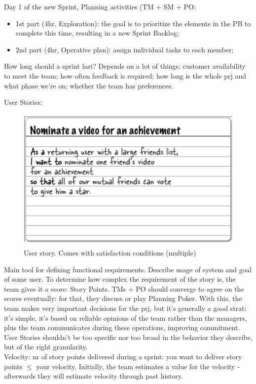 \noindent Day 1 of the new Sprint, Planning activities (TM + SM + PO:
\begin{itemize}
    \item 1st part (4hr, Exploration): the goal is to prioritize the elements in the PB to complete this time, resulting in a new Sprint Backlog;
    \item 2nd part (4hr, Operative plan): assign individual tasks to each member;
\end{itemize}

\noindent How long should a sprint last? Depends on a lot of things: customer availability to meet the team; how often feedback is required; how long is the whole prj and what phase we're on; whether the team has preferences.

 \noindent User Stories:
 \begin{figure}[H]
     \centering
     \includegraphics[scale=0.4]{Figures/02/usrstories.png}
     \caption{User story. Comes with satisfaction conditions (multiple)}
     \label{fig:us1}
 \end{figure}

\noindent Main tool for defining functional requirements. Describe usage of system and goal of some user. To determine how complex the requirement of the story is, the team gives it a score: Story Points. TMs + PO should converge to agree on the scores eventually: for that, they discuss or play Planning Poker. With this, the team makes very important decisions for the prj, but it's generally a good strat: it's simple, it's based on reliable opinions of the team rather than the managers, plus the team communicates during these operations, improving commitment. User Stories shouldn't be too specific nor too broad in the behavior they describe, but of the right granularity.\\Velocity: nr of story points delivered during a sprint: you want to deliver story points $\leq$ your velocity. Initially, the team estimates a value for the velocity - afterwards they will estimate velocity through past history.

